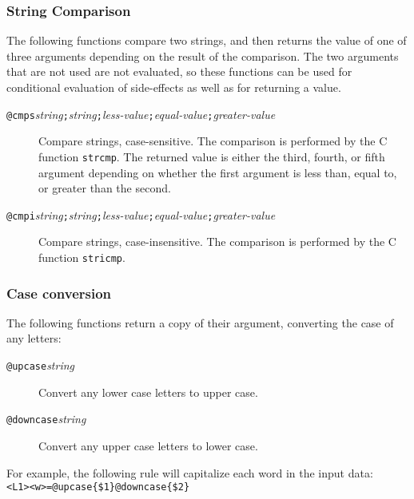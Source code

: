 \subsubsection{String Comparison}
The following functions compare two strings, and then returns the value
of one of three arguments depending on the result of the comparison.
The two arguments that are not used are not evaluated, so these
functions can be used for conditional evaluation of side-effects as well
as for returning a value.
\begin{description}
\item[{\tt @cmps\ttlb}{\it string}{\tt ;}{\it string}{\tt ;}{\it less-value}{\tt ;}{\it equal-value}{\tt ;}{\it greater-value}{\tt \ttrb}]
Compare strings, case-sensitive.
The comparison is performed by the C function \verb/strcmp/.
The returned value is either the third, fourth, or fifth argument
depending on whether the
first argument is less than, equal to, or greater than the second.
\item[{\tt @cmpi\ttlb}{\it string}{\tt ;}{\it string}{\tt ;}{\it less-value}{\tt ;}{\it equal-value}{\tt ;}{\it greater-value}{\tt \ttrb}]
Compare strings, case-insensitive.
The comparison is performed by the C function \verb/stricmp/.
\end{description}

\subsubsection{Case conversion}
The following functions return a copy of their argument, converting the
case of any letters:
\begin{description}
\item[{\tt @upcase\ttlb}{\it string}{\tt \ttrb}]
Convert any lower case letters to upper case.
\item[{\tt @downcase\ttlb}{\it string}{\tt \ttrb}]
Convert any upper case letters to lower case.
\end{description}
For example, the following rule will capitalize each word in the input data:
\newline
\verb/  <L1><w>=@upcase{$1}@downcase{$2}/

